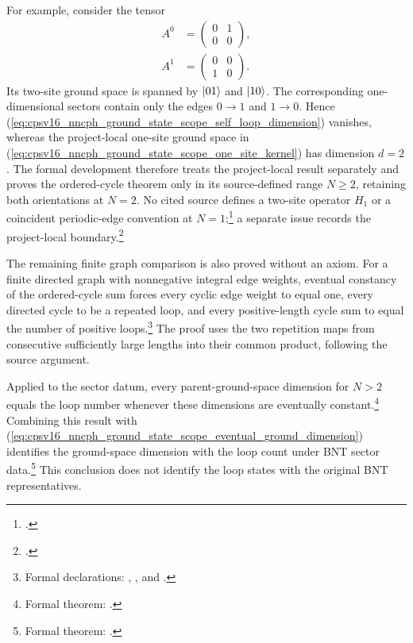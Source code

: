 \documentclass{article}
\begin{document}
For example, consider the tensor
\begin{align}
    A^0
        &=
        \begin{pmatrix}
            0&1\\
            0&0
        \end{pmatrix},
    \label{eq:cpsv16_nncph_ground_state_scope_counterexample_A_zero}\\
    A^1
        &=
        \begin{pmatrix}
            0&0\\
            1&0
        \end{pmatrix}.
    \label{eq:cpsv16_nncph_ground_state_scope_counterexample_A_one}
\end{align}
Its two-site ground space is spanned by $|01\rangle$ and $|10\rangle$. The
corresponding one-dimensional sectors contain only the edges $0\to1$ and
$1\to0$. Hence
(\ref{eq:cpsv16_nncph_ground_state_scope_self_loop_dimension}) vanishes,
whereas the project-local one-site ground space in
(\ref{eq:cpsv16_nncph_ground_state_scope_one_site_kernel}) has dimension
$d=2$. The formal development therefore treats the project-local result
separately and proves the ordered-cycle theorem only in its source-defined
range $N\geq2$, retaining both orientations at $N=2$. No cited source defines
a two-site operator $H_1$ or a coincident periodic-edge convention at
$N=1$;\footnote{.} a separate issue records the project-local
boundary.\footnote{.}

The remaining finite graph comparison is also proved without an axiom. For a
finite directed graph with nonnegative integral edge weights, eventual constancy
of the ordered-cycle sum forces every cyclic edge weight to equal one, every
directed cycle to be a repeated loop, and every positive-length cycle sum to
equal the number of positive loops.\footnote{Formal declarations:
,
, and
.} The proof uses the
two repetition maps from consecutive sufficiently large lengths into their
common product, following the source argument.

Applied to the sector datum, every parent-ground-space dimension for $N>2$
equals the loop number whenever these dimensions are eventually
constant.\footnote{Formal theorem:
.}
Combining this result with
(\ref{eq:cpsv16_nncph_ground_state_scope_eventual_ground_dimension}) identifies
the ground-space dimension with the loop count under BNT sector
data.\footnote{Formal theorem:
.}
This conclusion does not identify the loop states with the original BNT
representatives.
\end{document}
